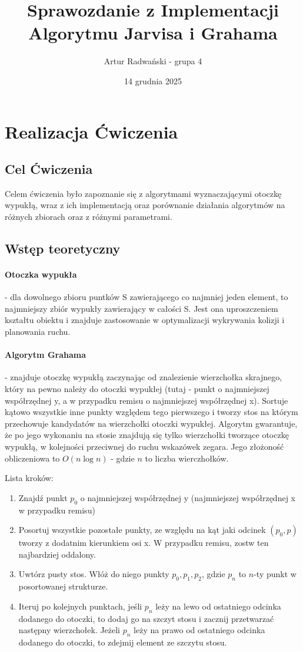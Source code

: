 \documentclass[12pt, a4paper]{article}
\title{Sprawozdanie z Implementacji Algorytmu Jarvisa i Grahama}
\author{Artur Radwański - grupa 4}
\date{14 grudnia 2025}
\begin{document}
\maketitle

\section{Realizacja Ćwiczenia}
\subsection{Cel Ćwiczenia}
Celem ćwiczenia było zapoznanie się z algorytmami wyznaczającymi otoczkę wypukłą, wraz z ich implementacją oraz
porównanie działania algorytmów na różnych zbiorach oraz z różnymi parametrami.

\subsection{Wstęp teoretyczny}
\paragraph{Otoczka wypukła} - dla dowolnego zbioru puntków S zawierającego co najmniej jeden element, to najmniejszy zbiór wypukły
zawierający w całości S. Jest ona uproszczeniem kształtu obiektu i znajduje zastosowanie w optymalizacji wykrywania kolizji i 
planowania ruchu.


\paragraph{Algorytm Grahama} - znajduje otoczkę wypukłą zaczynając od znalezienie wierzchołka skrajnego, który na pewno należy do
otoczki wypukłej (tutaj - punkt o najmniejszej współrzędnej y, a w przypadku remisu o najmniejszej współrzędnej x). Sortuje kątowo
wszystkie inne punkty względem tego pierwszego i tworzy stos na którym przechowuje kandydatów na wierzchołki otoczki wypukłej.
Algorytm gwarantuje, że po jego wykonaniu na stosie znajdują się tylko wierzchołki tworzące otoczkę wypukłą, w kolejności przeciwnej
do ruchu wskazówek zegara. Jego złożoność obliczeniowa to $O(n\log{n})$ - gdzie $n$ to liczba wierczhołków.

\noindent
Lista kroków:
\begin{enumerate}
    \item Znajdź punkt $p_{0}$ o najmniejszej współrzędnej y (najmniejszej współrzędnej x w przypadku remisu)
    \item Posortuj wszystkie pozostałe punkty, ze względu na kąt jaki odcinek $(p_{0},p)$ tworzy z dodatnim kierunkiem osi x.
    W przypadku remisu, zostw ten najbardziej oddalony.
    \item Uwtórz pusty stos. Włóż do niego punkty $p_{0},p_{1},p_{2}$, gdzie $p_{n}$ to $n$-ty punkt w posortowanej strukturze.
    \item Iteruj po kolejnych punktach, jeśli $p_{n}$ leży na lewo od ostatniego odcinka dodanego do otoczki, to dodaj 
    go na szczyt stosu i zacznij przetwarzać następny wierzchołek. Jeżeli $p_{n}$ leży na prawo od ostatniego odcinka dodanego do 
    otoczki, to zdejmij element ze szczytu stosu.
\end{enumerate}
\end{document}
